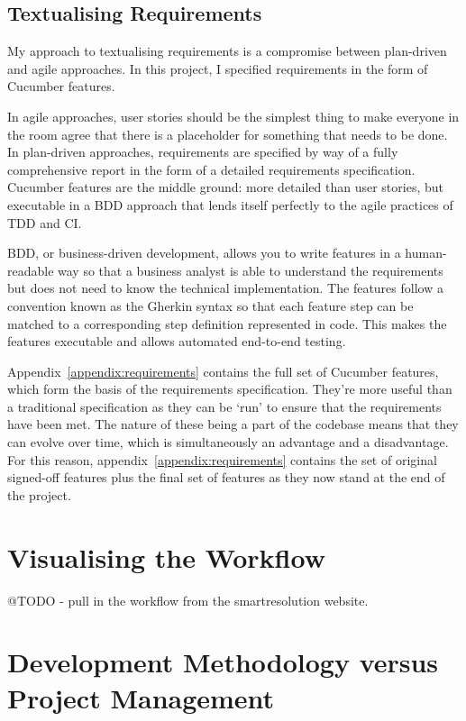 \subsection{Textualising Requirements}

My approach to textualising requirements is a compromise between plan-driven and agile approaches. In this project, I specified requirements in the form of Cucumber features.

In agile approaches, user stories should be the simplest thing to make everyone in the room agree that there is a placeholder for something that needs to be done. In plan-driven approaches, requirements are specified by way of a fully comprehensive report in the form of a detailed requirements specification. Cucumber features are the middle ground: more detailed than user stories, but executable in a BDD approach that lends itself perfectly to the agile practices of TDD and CI.

BDD, or business-driven development, allows you to write features in a human-readable way so that a business analyst is able to understand the requirements but does not need to know the technical implementation. The features follow a convention known as the Gherkin syntax so that each feature step can be matched to a corresponding step definition represented in code. This makes the features executable and allows automated end-to-end testing.

Appendix~\ref{appendix:requirements} contains the full set of Cucumber features, which form the basis of the requirements specification. They're more useful than a traditional specification as they can be `run' to ensure that the requirements have been met. The nature of these being a part of the codebase means that they can evolve over time, which is simultaneously an advantage and a disadvantage. For this reason, appendix~\ref{appendix:requirements} contains the set of original signed-off features plus the final set of features as they now stand at the end of the project.

\section{Visualising the Workflow}

@TODO - pull in the workflow from the smartresolution website.

\section{Development Methodology versus Project Management}

